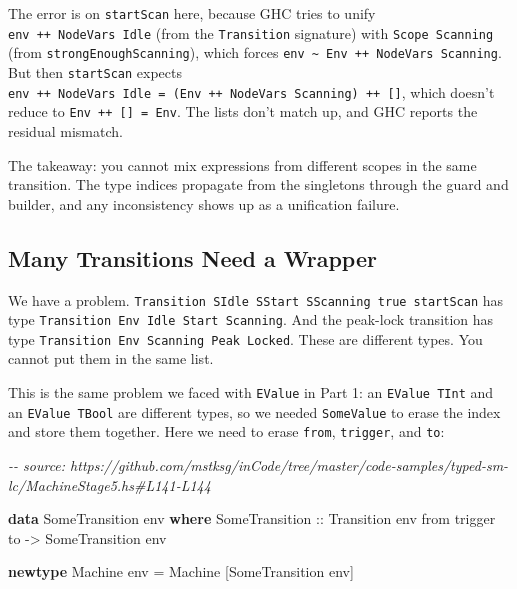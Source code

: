 \documentclass[]{article}
\newenvironment{Shaded}{}{}
\newcommand{\CommentTok}[1]{\textcolor[rgb]{0.38,0.63,0.69}{\textit{#1}}}
\newcommand{\DataTypeTok}[1]{\textcolor[rgb]{0.56,0.13,0.00}{#1}}
\newcommand{\KeywordTok}[1]{\textcolor[rgb]{0.00,0.44,0.13}{\textbf{#1}}}
\newcommand{\NormalTok}[1]{#1}
\newcommand{\OtherTok}[1]{\textcolor[rgb]{0.00,0.44,0.13}{#1}}
\begin{document}
The error is on \texttt{startScan} here, because GHC tries to unify
\texttt{env\ ++\ NodeVars\ Idle} (from the \texttt{Transition} signature) with
\texttt{Scope\ Scanning} (from \texttt{strongEnoughScanning}), which forces
\texttt{env\ \textasciitilde{}\ Env\ ++\ NodeVars\ Scanning}. But then
\texttt{startScan} expects
\texttt{env\ ++\ NodeVars\ Idle\ =\ (Env\ ++\ NodeVars\ Scanning)\ ++\ {[}{]}},
which doesn't reduce to \texttt{Env\ ++\ {[}{]}\ =\ Env}. The lists don't match
up, and GHC reports the residual mismatch.

The takeaway: you cannot mix expressions from different scopes in the same
transition. The type indices propagate from the singletons through the guard and
builder, and any inconsistency shows up as a unification failure.

\subsection{Many Transitions Need a
Wrapper}\label{many-transitions-need-a-wrapper}

We have a problem.
\texttt{Transition\ SIdle\ SStart\ SScanning\ true\ startScan} has type
\texttt{Transition\ Env\ Idle\ Start\ Scanning}. And the peak-lock transition
has type \texttt{Transition\ Env\ Scanning\ Peak\ Locked}. These are different
types. You cannot put them in the same list.

This is the same problem we faced with \texttt{EValue} in Part 1: an
\texttt{EValue\ TInt} and an \texttt{EValue\ TBool} are different types, so we
needed \texttt{SomeValue} to erase the index and store them together. Here we
need to erase \texttt{from}, \texttt{trigger}, and \texttt{to}:

\begin{Shaded}
\begin{Highlighting}[]
\CommentTok{{-}{-} source: https://github.com/mstksg/inCode/tree/master/code{-}samples/typed{-}sm{-}lc/MachineStage5.hs\#L141{-}L144}

\KeywordTok{data} \DataTypeTok{SomeTransition}\NormalTok{ env }\KeywordTok{where}
  \DataTypeTok{SomeTransition}\OtherTok{ ::} \DataTypeTok{Transition}\NormalTok{ env from trigger to }\OtherTok{{-}\textgreater{}} \DataTypeTok{SomeTransition}\NormalTok{ env}

\KeywordTok{newtype} \DataTypeTok{Machine}\NormalTok{ env }\OtherTok{=} \DataTypeTok{Machine}\NormalTok{ [}\DataTypeTok{SomeTransition}\NormalTok{ env]}
\end{Highlighting}
\end{Shaded}
\end{document}
